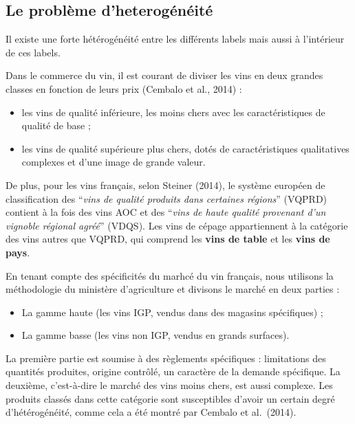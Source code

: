 \documentclass[11pt,]{article}
\begin{document}
\hypertarget{le-probleme-dheterogeneite}{%
\subsection{Le problème
d'heterogénéité}\label{le-probleme-dheterogeneite}}

Il existe une forte hétérogénéité entre les différents labels mais aussi
à l'intérieur de ces labels.

Dans le commerce du vin, il est courant de diviser les vins en deux
grandes classes en fonction de leurs prix (Cembalo et al., 2014) :

\begin{itemize}
    \item les vins de qualité inférieure, les moins chers avec les caractéristiques de qualité de base ;
    \item les vins de qualité supérieure plus chers, dotés de caractéristiques qualitatives complexes et d'une image de grande valeur.
\end{itemize} 
\par

De plus, pour les vins français, selon Steiner (2014), le système
européen de classification des
``\textit{vins de qualité produits dans certaines régions}'' (VQPRD)
contient à la fois des vins AOC et des
``\textit{vins de haute qualité provenant d'un vignoble régional agréé}''
(VDQS). Les vins de cépage appartiennent à la catégorie des vins autres
que VQPRD, qui comprend les \textbf{vins de table} et les
\textbf{vins de pays}.

\par

En tenant compte des spécificités du marhcé du vin français, nous
utilisons la méthodologie du ministère d'agriculture et divisons le
marché en deux parties :

\begin{itemize}
    \item La gamme haute (les vins IGP, vendus dans des magasins spécifiques) ;
    \item La gamme basse (les vins non IGP, vendus en grands surfaces).
\end{itemize}
\par

La première partie est soumise à des règlements spécifiques :
limitations des quantités produites, origine contrôlé, un caractère de
la demande spécifique. La deuxième, c'est-à-dire le marché des vins
moins chers, est aussi complexe. Les produits classés dans cette
catégorie sont susceptibles d'avoir un certain degré d'hétérogénéité,
comme cela a été montré par Cembalo et al.~(2014).
\end{document}
